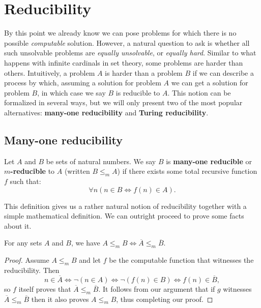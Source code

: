 \documentclass[../main.tex]{memoir}
\begin{document}
\section{Reducibility}

By this point we already know we can pose problems for which there is no possible \textit{computable} solution. However, a natural question to ask is whether all such unsolvable problems are \textit{equally unsolvable}, or \textit{equally hard}. Similar to what happens with infinite cardinals in set theory, some problems are harder than others. Intuitively, a problem $A$ is harder than a problem $B$ if we can describe a process by which, assuming a solution for problem $A$ we can get a solution for problem $B$, in which case we say $B$ is reducible to $A$. This notion can be formalized in several ways, but we will only present two of the most popular alternatives: \textbf{many-one reducibility} and \textbf{Turing reducibility}.

\subsection{Many-one reducibility}

\begin{definition}
  \label{def:m-red}
  Let $A$ and $B$ be sets of natural numbers. We say $B$ is \textbf{many-one reducible} or \textbf{$m$-reducible} to $A$ (written $B \le_m A$) if there exists some total recursive function $f$ such that:
  \[ \forall n (n \in B \iff f(n) \in A). \]
\end{definition}

This definition gives us a rather natural notion of reducibility together with a simple mathematical definition. We can outright proceed to prove some facts about it.

\begin{lemma}
  For any sets $A$ and $B$, we have $A \le_m B \iff \overline{A} \le_m \overline{B}$.
\end{lemma}
\begin{proof}
  Assume $A \le_m B$ and let $f$ be the computable function that witnesses the reducibility. Then
  \[ n \in \overline{A} \iff \neg (n \in A) \iff \neg (f(n) \in B) \iff f(n) \in \overline{B}, \]
  so $f$ itself proves that $\overline{A} \le_m \overline{B}$. It follows from our argument that if $g$ witnesses $\overline{A} \le_m \overline{B}$ then it also proves $A \le_m B$, thus completing our proof.
\end{proof}
\end{document}
